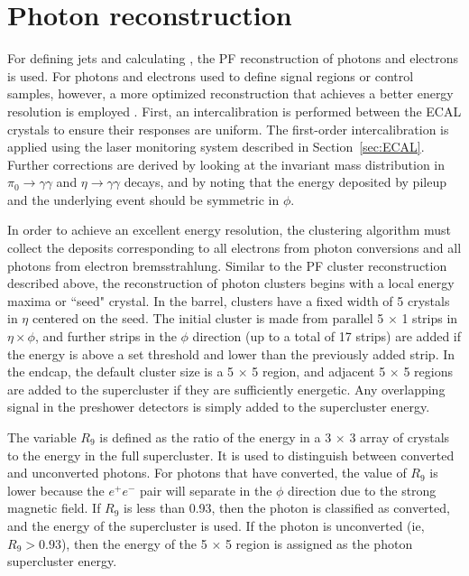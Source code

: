 \section{Photon reconstruction}
\label{sec:phoReco}
For defining jets and calculating \ETmiss, the PF reconstruction of photons and electrons is used. 
For photons and electrons used to define signal regions or control samples, however, a more optimized reconstruction that achieves a better energy resolution is employed \cite{phoPerf8TeV,elePerf8TeV}. First, an intercalibration is performed between the ECAL crystals to ensure their responses are uniform. The first-order intercalibration is applied using the laser monitoring system described in Section~\ref{sec:ECAL}. Further corrections are derived by looking at the invariant mass distribution in $\pi_0 \rightarrow \gamma\gamma$ and $\eta \rightarrow \gamma\gamma$ decays, and by noting that the energy deposited by pileup and the underlying event should be symmetric in $\phi$.

In order to achieve an excellent energy resolution, the clustering algorithm must collect the deposits corresponding to all electrons from photon conversions and all photons from electron bremsstrahlung. Similar to the PF cluster reconstruction described above, the reconstruction of photon clusters begins with a local energy maxima or ``seed" crystal. In the barrel, clusters have a fixed width of 5 crystals in $\eta$ centered on the seed. The initial cluster is made from parallel 5 $\times$ 1 strips in $\eta \times \phi$, and further strips in the $\phi$ direction (up to a total of 17 strips) are added if the energy is above a set threshold and lower than the previously added strip. In the endcap, the default cluster size is a 5 $\times$ 5 region, and adjacent 5 $\times$ 5 regions are added to the supercluster if they are sufficiently energetic. Any overlapping signal in the preshower detectors is simply added to the supercluster energy.

The variable $R_9$ is defined as the ratio of the energy in a 3 $\times$ 3 array of crystals to the energy in the full supercluster. It is used to distinguish between converted and unconverted photons. For photons that have converted, the value of $R_9$ is lower because the $e^+e^-$ pair will separate in the $\phi$ direction due to the strong magnetic field. If $R_9$ is less than 0.93, then the photon is classified as converted, and the energy of the supercluster is used. If the photon is unconverted (ie, $R_9 > 0.93$), then the energy of the 5 $\times$ 5 region is assigned as the photon supercluster energy.

